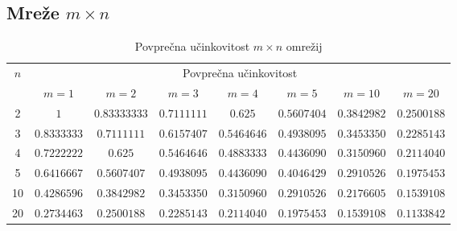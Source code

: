 \documentclass[a4paper, 16pt]{article}
\begin{document}
    \subsection{Mreže $m \times n$}
    

    \begin{table}[!h]
        \begin{tabular}{c|c|c|c|c|c|c|c}
            \multirow{2}{*}{$n$} & 
            \multicolumn{7}{c}{Povprečna učinkovitost}\\
               & $m=1$       & $m=2$           & $m=3$           & $m=4$         & $m = 5$     & $m = 10$    & $m=20$     \\ \hline
            2  & $1$         & $0.83333333$ & $0.7111111$ & $0.625$       & $0.5607404$ & $0.3842982$ & $0.2500188$\\
            3  & $0.8333333$ & $0.7111111$  & $0.6157407$ & $0.5464646$   & $0.4938095$ & $0.3453350$ & $0.2285143$\\
            4  & $0.7222222$ & $0.625$      & $0.5464646$ & $0.4883333$   & $0.4436090$ & $0.3150960$ & $0.2114040$\\
            5  & $0.6416667$ & $0.5607407$  & $0.4938095$ & $0.4436090$   & $0.4046429$ & $0.2910526$ & $0.1975453$\\
            10 & $0.4286596$ & $0.3842982$  & $0.3453350$ & $0.3150960$   & $0.2910526$ & $0.2176605$ & $0.1539108$\\
            20 & $0.2734463$ & $0.2500188$  & $0.2285143$ & $0.2114040$   & $0.1975453$ & $0.1539108$ & $0.1133842$\\

        \end{tabular}
        \caption{Povprečna učinkovitost $m \times n$ omrežij}
        \label{table: 1}
    \end{table}
\end{document}
